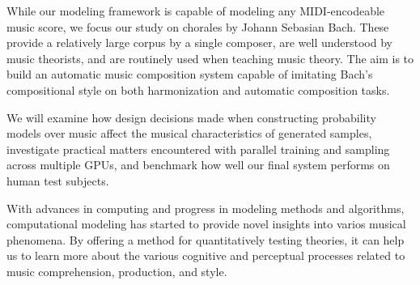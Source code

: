 \documentclass[dissertation.tex]{subfiles}
\begin{document}
While our modeling framework is capable of modeling any MIDI-encodeable music
score, we focus our study on chorales by Johann Sebasian Bach. These provide
a relatively large corpus by a single composer, are well understood by music
theorists, and are routinely used when teaching music theory.
The aim is to build an automatic music composition system capable of imitating
Bach's compositional style on both harmonization and automatic composition tasks.

We will examine how design decisions made when constructing probability models
over music affect the musical characteristics of generated samples, investigate
practical matters encountered with parallel training and sampling across
multiple GPUs, and benchmark how well our final system performs on human test
subjects.

With advances in computing and progress in modeling methods and algorithms,
computational modeling has started to provide novel insights into varios
musical phenomena. By offering a method for quantitatively testing theories,
it can help us to learn more about the various cognitive and perceptual processes
related to music comprehension, production, and style.

\printbibliography
\end{document}
